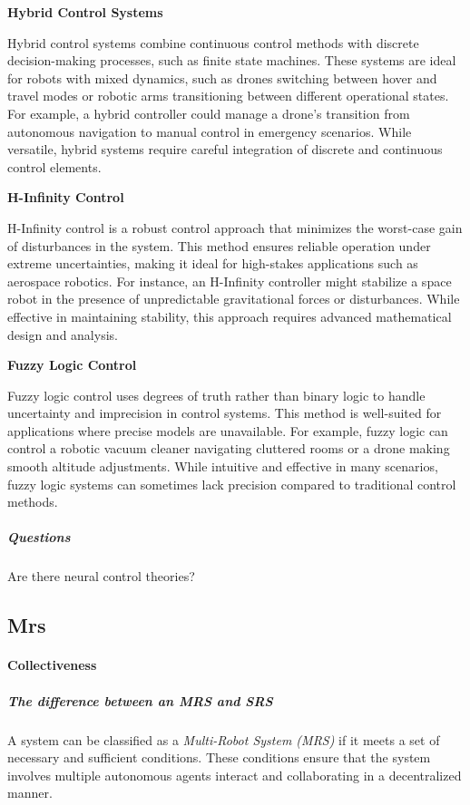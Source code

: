 \documentclass{book}
\providecommand{\ProjectDeepHeading}[2]{%
    \par\medskip\noindent\textbf{#2}\par\smallskip
}
\begin{document}
\ProjectDeepHeading{1}{Hybrid Control Systems}
Hybrid control systems combine continuous control methods with discrete decision-making processes, such as finite state machines. These systems are ideal for robots with mixed dynamics, such as drones switching between hover and travel modes or robotic arms transitioning between different operational states. For example, a hybrid controller could manage a drone's transition from autonomous navigation to manual control in emergency scenarios. While versatile, hybrid systems require careful integration of discrete and continuous control elements.

\ProjectDeepHeading{1}{H-Infinity Control}
H-Infinity control is a robust control approach that minimizes the worst-case gain of disturbances in the system. This method ensures reliable operation under extreme uncertainties, making it ideal for high-stakes applications such as aerospace robotics. For instance, an H-Infinity controller might stabilize a space robot in the presence of unpredictable gravitational forces or disturbances. While effective in maintaining stability, this approach requires advanced mathematical design and analysis.

\ProjectDeepHeading{1}{Fuzzy Logic Control}
Fuzzy logic control uses degrees of truth rather than binary logic to handle uncertainty and imprecision in control systems. This method is well-suited for applications where precise models are unavailable. For example, fuzzy logic can control a robotic vacuum cleaner navigating cluttered rooms or a drone making smooth altitude adjustments. While intuitive and effective in many scenarios, fuzzy logic systems can sometimes lack precision compared to traditional control methods.

\subparagraph{Questions}

Are there neural control theories?

\subsection{Mrs}


\paragraph{Collectiveness}


\subparagraph{The difference between an MRS and SRS}
A system can be classified as a \textit{Multi-Robot System (MRS)} if it meets a set of necessary and sufficient conditions. These conditions ensure that the system involves multiple autonomous agents interact and collaborating in a decentralized manner.
\end{document}
